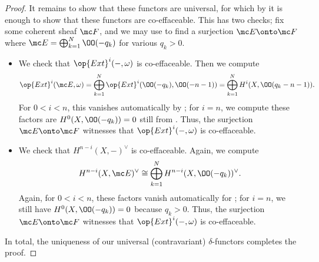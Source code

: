 \documentclass[../notes.tex]{subfiles}
\begin{document}
\begin{proof}
	It remains to show that these functors are universal, for which by  it is enough to show that these functors are co-effaceable. This has two checks; fix some coherent sheaf $\mc F$, and we may use \cite[Corollary~II.5.18]{hartshorne} to find a surjection $\mc E\onto\mc F$ where $\mc E=\bigoplus_{k=1}^N\OO(-q_k)$ for various $q_k>0$.
	\begin{itemize}
		\item We check that $\op{Ext}^i(-,\omega)$ is co-effaceable. Then we compute
		\[\op{Ext}^i(\mc E,\omega)=\bigoplus_{k=1}^N\op{Ext}^i(\OO(-q_k),\OO(-n-1))=\bigoplus_{k=1}^NH^i(X,\OO(q_k-n-1)).\]
		For $0<i<n$, this vanishes automatically by ; for $i=n$, we compute these factors are $H^0(X,\OO(-q_k))=0$ still from . Thus, the surjection $\mc E\onto\mc F$ witnesses that $\op{Ext}^i(-,\omega)$ is co-effaceable.
		\item We check that $H^{n-i}(X,-)^\lor$ is co-effaceable. Again, we compute
		\[H^{n-i}(X,\mc E)^\lor\cong\bigoplus_{k=1}^NH^{n-i}(X,\OO(-q_k))^\lor.\]
		Again, for $0<i<n$, these factors vanish automatically for ; for $i=n$, we still have $H^0(X,\OO(-q_k))=0$ because $q_k>0$. Thus, the surjection $\mc E\onto\mc F$ witnesses that $\op{Ext}^i(-,\omega)$ is co-effaceable.
	\end{itemize}
	In total, the uniqueness of our universal (contravariant) $\delta$-functors completes the proof.
\end{proof}
\end{document}
